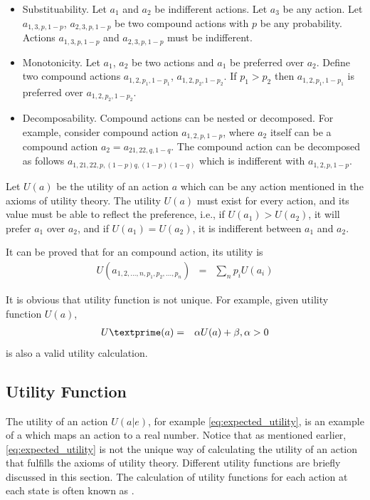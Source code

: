 \begin{mdframed}
\begin{itemize}
	\item Substituability. Let $a_1$ and $a_2$ be indifferent actions. Let $a_3$ be any action. Let $a_{1,3,p,1-p}$, $a_{2,3,p,1-p}$ be two compound actions with $p$ be any probability. Actions $a_{1,3,p,1-p}$ and $a_{2,3,p,1-p}$ must be indifferent.
	
	\item Monotonicity. Let $a_1$, $a_2$ be two actions and $a_1$ be preferred over $a_2$. Define two compound actions $a_{1,2,p_1,1-p_1}$, $a_{1,2,p_2,1-p_2}$. If $p_1 > p_2$ then $a_{1,2,p_1,1-p_1}$ is preferred over $a_{1,2,p_2,1-p_2}$.
	
	\item Decomposability. Compound actions can be nested or decomposed. For example, consider compound action $a_{1,2,p,1-p}$, where $a_2$ itself can be a compound action $a_2 = a_{21, 22, q,1-q}$. The compound action can be decomposed as follows $a_{1, 21, 22,p,(1-p)q,(1-p)(1-q)}$ which is indifferent with $a_{1,2,p,1-p}$.
\end{itemize}

Let $U(a)$ be the utility of an action $a$ which can be any action mentioned in the axioms of utility theory. The utility $U(a)$ must exist for every action, and its value must be able to reflect the preference, i.e., if $U(a_1) > U(a_2)$, it will prefer $a_1$ over $a_2$, and if $U(a_1) = U(a_2)$, it is indifferent between $a_1$ and $a_2$.

It can be proved that for an compound action, its utility is 
\begin{eqnarray}
	U\left(a_{1,2,..., n,p_1,p_2,..., p_n}\right) &=& \sum_n p_i U(a_i) \nonumber
\end{eqnarray}

It is obvious that utility function is not unique. For example, given utility function $U(a)$,
\begin{eqnarray}
U\textprime (a) &=& \alpha U(a) + \beta, \alpha > 0 \nonumber
\end{eqnarray}
is also a valid utility calculation.

\end{mdframed}

\subsection{Utility Function}

The utility of an action $U(a|e)$, for example \eqref{eq:expected_utility}, is an example of a  which maps an action to a real number. Notice that as mentioned earlier, \eqref{eq:expected_utility} is not the unique way of calculating the utility of an action that fulfills the axioms of utility theory. Different utility functions are briefly discussed in this section. The calculation of utility functions for each action at each state is often known as .

